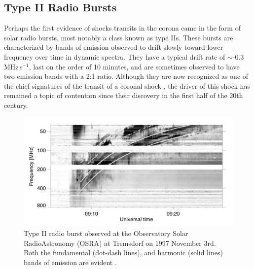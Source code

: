 \subsection{Type II Radio Bursts}
Perhaps the first evidence of shocks transits in the corona came in the form of solar radio bursts, most notably a class known as type IIs. These bursts are characterized by bands of emission observed to drift slowly toward lower frequency over time in dynamic spectra. They have a typical drift rate of $\sim$-0.3\,MHz\,s$^{-1}$, last on the order of 10 minutes, and are sometimes observed to have two emission bands with a 2:1 ratio. Although they are now recognized as one of the chief signatures of the transit of a coronal shock \citep{nelson1985, mann1996}, the driver of this shock has remained a topic of contention since their discovery in the first half of the 20th century.

\begin{figure}
\begin{center}
\includegraphics[trim=2cm 1cm 2cm 3cm, scale=0.25]{images/typeII}
\caption[Type II radio burst]{Type II radio burst observed at the Observatory Solar RadioAstronomy (OSRA) at Tremsdorf on 1997 November 3rd. Both the fundamental (dot-dash lines), and harmonic (solid lines) bands of emission are evident \citep{khan2002}.}
\label{fig:typeII}
\end{center}
\end{figure}

